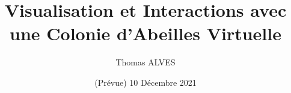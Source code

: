 





\author{Thomas ALVES}

\title{Visualisation et Interactions avec une Colonie d'Abeilles Virtuelle}

\date{(Prévue) 10 Décembre 2021}



